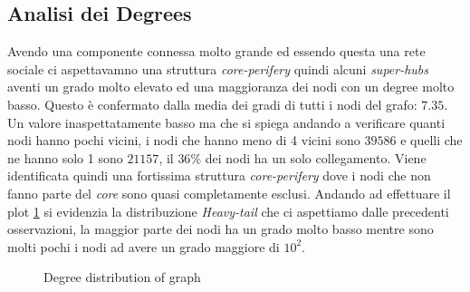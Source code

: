 \documentclass[a4paper]{article}
\begin{document}
\subsection{Analisi dei Degrees}
\label{SEC:Degree}
Avendo una componente connessa molto grande ed essendo questa una rete sociale ci aspettavamno una struttura \textit{core-perifery} quindi alcuni \textit{super-hubs} aventi un grado molto elevato ed una maggioranza dei nodi con un degree molto basso.
Questo è confermato dalla media dei gradi di tutti i nodi del grafo: $7.35$.
Un valore inaspettatamente basso ma che si spiega andando a verificare quanti nodi hanno pochi vicini, i nodi che hanno meno di 4 vicini sono $39586$ e quelli che ne hanno solo 1 sono $21157$, il $36\%$ dei nodi ha un solo collegamento.
Viene identificata quindi una fortissima struttura \textit{core-perifery} dove i nodi che non fanno parte del \textit{core} sono quasi completamente esclusi.
Andando ad effettuare il plot \ref{FIG:degree_dist_G} si evidenzia la distribuzione \textit{Heavy-tail} che ci aspettiamo dalle precedenti osservazioni, la maggior parte dei nodi ha un grado molto basso mentre sono molti pochi i nodi ad avere un grado maggiore di $10^2$.
\begin{figure}[!ht]
\centering
{}
\caption{Degree distribution of graph} \label{FIG:degree_dist_G}
\end{figure}
\end{document}
